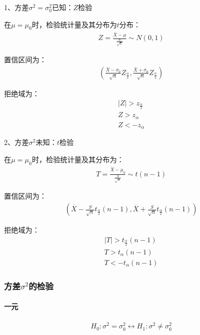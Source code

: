 \documentclass[12pt]{book}
\begin{document}
1、方差$\sigma^2 = \sigma^2_0$已知：$Z$检验

在$\mu = \mu_0$时，检验统计量及其分布为$t$分布：
\begin{gather*}
    Z=\frac{\overline{X}-\mu}{\frac{\sigma}{\sqrt{n}}}\sim N(0,1)
\end{gather*}


置信区间为：
\begin{gather*}
    \left(\frac{\overline{X}-\sigma_0}{\sqrt{n}}Z_{\frac{\alpha}{2}}, \frac{\overline{X}+\sigma_0}{\sqrt{n}}Z_{\frac{\alpha}{2}} \right)
\end{gather*}


拒绝域为：
\begin{gather*}
    \left|Z\right|>z_{\frac{\alpha}{2}} \\
    Z >  z_\alpha\\
    Z < -z_\alpha
\end{gather*}


2、方差$\sigma^2$未知：$t$检验

在$\mu = \mu_0$时，检验统计量及其分布为：
\begin{gather*}
    T=\frac{\overline{X}-\mu_0}{\frac{S}{\sqrt{n}}}\sim t(n-1)
\end{gather*}


置信区间为：
\begin{gather*}
    \left( \overline{X}-\frac{S}{\sqrt{n}}t_{\frac{\alpha}{2}}(n-1), \overline{X}+\frac{S}{\sqrt{n}}t_{\frac{\alpha}{2}}(n-1) \right)
\end{gather*}


拒绝域为：
\begin{gather*}
    \left|T\right|>t_{\frac{\alpha}{2}}\left(n-1\right) \\
    T>t_\alpha\left(n-1\right) \\
    T<-t_\alpha\left(n-1\right)
\end{gather*}







\subsubsection{方差$\sigma^2$的检验}

\paragraph{一元}


\begin{gather*}
    H_0: \sigma^2=\sigma_0^2 \leftrightarrow H_1: \sigma^2\neq\sigma_0^2 \\
\end{gather*}
\end{document}
